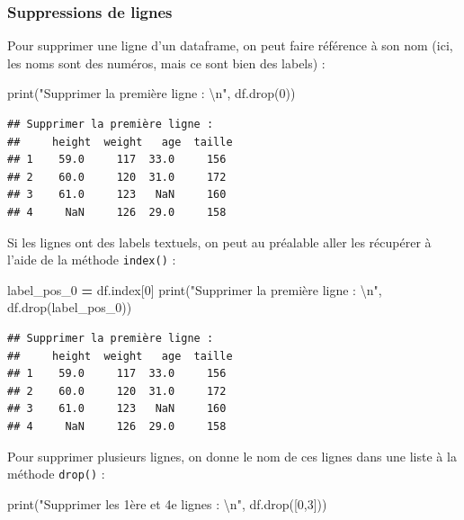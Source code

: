 \documentclass[12pt,]{book}
\newenvironment{Shaded}{\begin{snugshade}}{\end{snugshade}}
\newcommand{\DecValTok}[1]{\textcolor[rgb]{0.00,0.00,0.81}{#1}}
\newcommand{\CharTok}[1]{\textcolor[rgb]{0.31,0.60,0.02}{#1}}
\newcommand{\StringTok}[1]{\textcolor[rgb]{0.31,0.60,0.02}{#1}}
\newcommand{\OperatorTok}[1]{\textcolor[rgb]{0.81,0.36,0.00}{\textbf{#1}}}
\newcommand{\BuiltInTok}[1]{#1}
\newcommand{\NormalTok}[1]{#1}
\numberwithin{equation}{section}
\numberwithin{countremarque}{section}
\begin{document}
\subsubsection{Suppressions de lignes}\label{suppressions-de-lignes}

Pour supprimer une ligne d'un dataframe, on peut faire référence à son
nom (ici, les noms sont des numéros, mais ce sont bien des labels) :

\begin{Shaded}
\begin{Highlighting}[]
\BuiltInTok{print}\NormalTok{(}\StringTok{"Supprimer la première ligne :  }\CharTok{\textbackslash{}n}\StringTok{"}\NormalTok{, df.drop(}\DecValTok{0}\NormalTok{))}
\end{Highlighting}
\end{Shaded}

\begin{lstlisting}
## Supprimer la première ligne :  
##     height  weight   age  taille
## 1    59.0     117  33.0     156
## 2    60.0     120  31.0     172
## 3    61.0     123   NaN     160
## 4     NaN     126  29.0     158
\end{lstlisting}

Si les lignes ont des labels textuels, on peut au préalable aller les
récupérer à l'aide de la méthode \texttt{index()} :

\begin{Shaded}
\begin{Highlighting}[]
\NormalTok{label_pos_0 }\OperatorTok{=}\NormalTok{ df.index[}\DecValTok{0}\NormalTok{]}
\BuiltInTok{print}\NormalTok{(}\StringTok{"Supprimer la première ligne :  }\CharTok{\textbackslash{}n}\StringTok{"}\NormalTok{, df.drop(label_pos_0))}
\end{Highlighting}
\end{Shaded}

\begin{lstlisting}
## Supprimer la première ligne :  
##     height  weight   age  taille
## 1    59.0     117  33.0     156
## 2    60.0     120  31.0     172
## 3    61.0     123   NaN     160
## 4     NaN     126  29.0     158
\end{lstlisting}

Pour supprimer plusieurs lignes, on donne le nom de ces lignes dans une
liste à la méthode \texttt{drop()} :

\begin{Shaded}
\begin{Highlighting}[]
\BuiltInTok{print}\NormalTok{(}\StringTok{"Supprimer les 1ère et 4e lignes :  }\CharTok{\textbackslash{}n}\StringTok{"}\NormalTok{, df.drop([}\DecValTok{0}\NormalTok{,}\DecValTok{3}\NormalTok{]))}
\end{Highlighting}
\end{Shaded}
\end{document}
